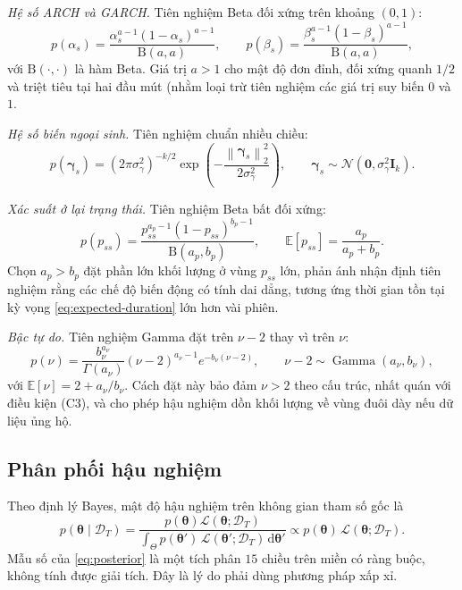 \documentclass[12pt,a4paper]{article}
\numberwithin{equation}{section}
\theoremstyle{definition}
\newcommand{\E}{\mathbb{E}}
\newcommand{\Data}{\mathcal{D}}
\newcommand{\Param}{\symbf{\theta}}
\newcommand{\bmgamma}{\symbf{\gamma}}
\newcommand{\diff}{\mathrm{d}}
\begin{document}
	\emph{Hệ số ARCH và GARCH.} Tiên nghiệm Beta đối xứng trên khoảng $(0,1)$:
	\begin{equation}
		p(\alpha_s)=\frac{\alpha_s^{a-1}\left(1-\alpha_s\right)^{a-1}}{\mathrm{B}(a,a)},
		\qquad
		p(\beta_s)=\frac{\beta_s^{a-1}\left(1-\beta_s\right)^{a-1}}{\mathrm{B}(a,a)},
		\label{eq:prior-alpha-beta}
	\end{equation}
	với $\mathrm{B}(\cdot,\cdot)$ là hàm Beta. Giá trị $a>1$ cho mật độ đơn đỉnh, đối xứng
	quanh $1/2$ và triệt tiêu tại hai đầu mút (nhằm loại trừ tiên nghiệm các giá trị suy biến $0$ và $1$.
	
	\emph{Hệ số biến ngoại sinh.} Tiên nghiệm chuẩn nhiều chiều:
	\begin{equation}
		p(\bmgamma_s)=\left(2\pi\sigma_\gamma^{2}\right)^{-k/2}
		\exp\!\left(-\frac{\left\|\bmgamma_s\right\|_2^{2}}{2\sigma_\gamma^{2}}\right),
		\qquad \bmgamma_s\sim\mathcal{N}\!\left(\symbf 0,\sigma_\gamma^{2}\symbf I_k\right).
		\label{eq:prior-gamma}
	\end{equation}
	
	\emph{Xác suất ở lại trạng thái.} Tiên nghiệm Beta bất đối xứng:
	\begin{equation}
		p(p_{ss})=\frac{p_{ss}^{a_p-1}\left(1-p_{ss}\right)^{b_p-1}}{\mathrm{B}(a_p,b_p)},
		\qquad \E\!\left[p_{ss}\right]=\frac{a_p}{a_p+b_p}.
		\label{eq:prior-transition}
	\end{equation}
	Chọn $a_p>b_p$ đặt phần lớn khối lượng ở vùng $p_{ss}$ lớn, phản ánh nhận định tiên
	nghiệm rằng các chế độ biến động có tính dai dẳng, tương ứng thời gian tồn tại kỳ vọng
	\eqref{eq:expected-duration} lớn hơn vài phiên.
	
	\emph{Bậc tự do.} Tiên nghiệm Gamma đặt trên $\nu-2$ thay vì trên $\nu$:
	\begin{equation}
		p(\nu)=\frac{b_\nu^{a_\nu}}{\Gamma(a_\nu)}
		\left(\nu-2\right)^{a_\nu-1}e^{-b_\nu(\nu-2)},
		\qquad \nu-2\sim\operatorname{Gamma}\!\left(a_\nu,b_\nu\right),
		\label{eq:prior-nu}
	\end{equation}
	với $\E[\nu]=2+a_\nu/b_\nu$. Cách đặt này bảo đảm $\nu>2$ theo cấu trúc, nhất quán với
	điều kiện (C3), và cho phép hậu nghiệm dồn khối lượng về vùng đuôi dày nếu dữ liệu ủng hộ.
	
	\subsection{Phân phối hậu nghiệm}\label{subsec:posterior}
	Theo định lý Bayes, mật độ hậu nghiệm trên không gian tham số gốc là
	\begin{equation}
		p\!\left(\Param\mid\Data_T\right)
		= \frac{p(\Param) \mathcal{L}(\Param;\Data_T)}{\displaystyle\int_{\Theta} p(\Param')\,\mathcal{L}(\Param';\Data_T)\,\diff\Param'}
		\propto p(\Param)\,\mathcal{L}(\Param;\Data_T).
		\label{eq:posterior}
	\end{equation}
	Mẫu số của \eqref{eq:posterior} là một tích phân $15$ chiều trên miền có ràng buộc, không
	tính được giải tích. Đây là lý do phải dùng phương pháp xấp xỉ.
	
\end{document}

